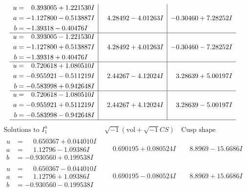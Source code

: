 \documentclass[1p]{elsarticle_modified}
\theoremstyle{definition}
\newcommand{\I}{\sqrt{-1}}
\begin{document}
$$\begin{array}{c|c|c}
\begin{aligned}
u &= \phantom{-}0.393005 + 1.221530 I \\
a &= -1.127800 - 0.513887 I \\
b &= -1.39318 - 0.40476 I\end{aligned}
 & \phantom{-}4.28492 - 4.01263 I & -0.30460 + 7.28252 I \\ \hline\begin{aligned}
u &= \phantom{-}0.393005 - 1.221530 I \\
a &= -1.127800 + 0.513887 I \\
b &= -1.39318 + 0.40476 I\end{aligned}
 & \phantom{-}4.28492 + 4.01263 I & -0.30460 - 7.28252 I \\ \hline\begin{aligned}
u &= \phantom{-}0.720618 + 1.080510 I \\
a &= -0.955921 - 0.511219 I \\
b &= -0.583998 + 0.942648 I\end{aligned}
 & \phantom{-}2.44267 - 4.12024 I & \phantom{-}3.28639 + 5.00197 I \\ \hline\begin{aligned}
u &= \phantom{-}0.720618 - 1.080510 I \\
a &= -0.955921 + 0.511219 I \\
b &= -0.583998 - 0.942648 I\end{aligned}
 & \phantom{-}2.44267 + 4.12024 I & \phantom{-}3.28639 - 5.00197 I\\
 \hline 
 \end{array}$$\newpage$$\begin{array}{c|c|c}  
\text{Solutions to }I^u_{1}& \I (\text{vol} + \sqrt{-1}CS) & \text{Cusp shape}\\
 \hline 
\begin{aligned}
u &= \phantom{-}0.650367 + 0.044010 I \\
a &= \phantom{-}1.12796 - 1.09386 I \\
b &= -0.930560 + 0.199538 I\end{aligned}
 & \phantom{-}0.690195 + 0.080524 I & \phantom{-}8.8969 - 15.6686 I \\ \hline\begin{aligned}
u &= \phantom{-}0.650367 - 0.044010 I \\
a &= \phantom{-}1.12796 + 1.09386 I \\
b &= -0.930560 - 0.199538 I\end{aligned}
 & \phantom{-}0.690195 - 0.080524 I & \phantom{-}8.8969 + 15.6686 I \\ \hline\begin{aligned}

\end{aligned}
\end{array}$$
\end{document}
